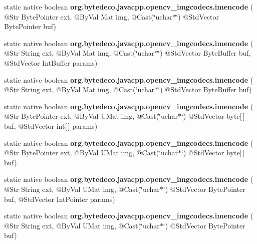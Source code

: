 \begin{DoxyCompactItemize}
\mbox{\label{group__imgcodecs_ga250aecd5f2bb6ce6bcc8b14cfa547cdc}} 
static native boolean {\bfseries org.\+bytedeco.\+javacpp.\+opencv\+\_\+imgcodecs.\+imencode} ( @Str Byte\+Pointer ext, @By\+Val Mat img, @Cast(\char`\"{}uchar$\ast$\char`\"{}) @Std\+Vector Byte\+Pointer buf)
\item 
\mbox{\label{group__imgcodecs_ga4f9c9d28edc21bdc4c39e9084296c981}} 
static native boolean {\bfseries org.\+bytedeco.\+javacpp.\+opencv\+\_\+imgcodecs.\+imencode} ( @Str String ext, @By\+Val Mat img, @Cast(\char`\"{}uchar$\ast$\char`\"{}) @Std\+Vector Byte\+Buffer buf, @Std\+Vector Int\+Buffer params)
\item 
\mbox{\label{group__imgcodecs_ga5b31bdc658ac5cda36cf1d8816dda9c7}} 
static native boolean {\bfseries org.\+bytedeco.\+javacpp.\+opencv\+\_\+imgcodecs.\+imencode} ( @Str String ext, @By\+Val Mat img, @Cast(\char`\"{}uchar$\ast$\char`\"{}) @Std\+Vector Byte\+Buffer buf)
\item 
\mbox{\label{group__imgcodecs_gad3b2acf8312fd8c882fec8de71fe2b0f}} 
static native boolean {\bfseries org.\+bytedeco.\+javacpp.\+opencv\+\_\+imgcodecs.\+imencode} ( @Str Byte\+Pointer ext, @By\+Val U\+Mat img, @Cast(\char`\"{}uchar$\ast$\char`\"{}) @Std\+Vector byte\mbox{[}$\,$\mbox{]} buf, @Std\+Vector int\mbox{[}$\,$\mbox{]} params)
\item 
\mbox{\label{group__imgcodecs_ga8991aa98532b4f0d61ec5f1f7c72be26}} 
static native boolean {\bfseries org.\+bytedeco.\+javacpp.\+opencv\+\_\+imgcodecs.\+imencode} ( @Str Byte\+Pointer ext, @By\+Val U\+Mat img, @Cast(\char`\"{}uchar$\ast$\char`\"{}) @Std\+Vector byte\mbox{[}$\,$\mbox{]} buf)
\item 
\mbox{\label{group__imgcodecs_ga2dd78f1fa6b1d210d02168d529e1d8a4}} 
static native boolean {\bfseries org.\+bytedeco.\+javacpp.\+opencv\+\_\+imgcodecs.\+imencode} ( @Str String ext, @By\+Val U\+Mat img, @Cast(\char`\"{}uchar$\ast$\char`\"{}) @Std\+Vector Byte\+Pointer buf, @Std\+Vector Int\+Pointer params)
\item 
\mbox{\label{group__imgcodecs_gab69a1bb10bd40bc0f1ffdb13e966dad7}} 
static native boolean {\bfseries org.\+bytedeco.\+javacpp.\+opencv\+\_\+imgcodecs.\+imencode} ( @Str String ext, @By\+Val U\+Mat img, @Cast(\char`\"{}uchar$\ast$\char`\"{}) @Std\+Vector Byte\+Pointer buf)

\end{DoxyCompactItemize}
